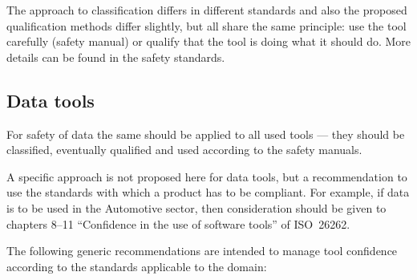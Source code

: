 The approach to classification differs in different standards and also the proposed qualification methods differ slightly,
but all share the same principle: use the tool carefully (safety manual) or qualify that the tool is doing what it should do.
More details can be found in the safety standards.

\subsection{Data tools}
 
For safety of data the same should be applied to all used tools --- they should be classified, eventually qualified and used according to the safety manuals.
 
A specific approach is not proposed here for data tools,
but a recommendation to use the standards with which a product has to be compliant.
For example, if data is to be used in the Automotive sector,
then consideration should be given to chapters 8--11 ``Confidence in the use of  software tools'' of ISO\ 26262.
 
The following generic recommendations are intended to manage tool confidence according to the standards applicable to the domain:


